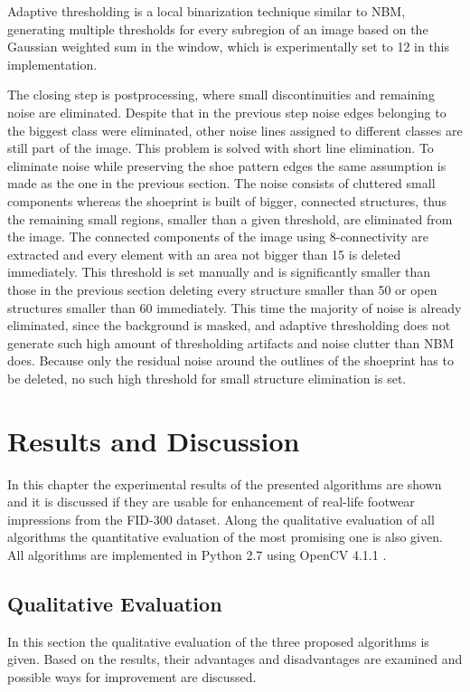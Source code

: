 \documentclass[draft,final]{vutinfth} %
\begin{document}
Adaptive thresholding is a local binarization technique similar to NBM, generating multiple thresholds for every subregion of an image based on the Gaussian weighted sum in the window, which is experimentally set to 12 in this implementation.
\par
The closing step is postprocessing, where small discontinuities and remaining noise are eliminated.
Despite that in the previous step noise edges belonging to the biggest class were eliminated, other noise lines assigned to different classes are still part of the image.
This problem is solved with short line elimination.
To eliminate noise while preserving the shoe pattern edges the same assumption is made as the one in the previous section.
The noise consists of cluttered small components whereas the shoeprint is built of bigger, connected structures, thus the remaining small regions, smaller than a given threshold, are eliminated from the image.
The connected components of the image using 8-connectivity are extracted and every element with an area not bigger than 15 is deleted immediately.
This threshold is set manually and is significantly smaller than those in the previous section deleting every structure smaller than 50 or open structures smaller than 60 immediately.
This time the majority of noise is already eliminated, since the background is masked, and adaptive thresholding does not generate such high amount of thresholding artifacts and noise clutter than NBM does.
Because only the residual noise around the outlines of the shoeprint has to be deleted, no such high threshold for small structure elimination is set.

\chapter{Results and Discussion}
\label{results}
\par
In this chapter the experimental results of the presented algorithms are shown and it is discussed if they are usable for enhancement of real-life footwear impressions from the FID-300 dataset.
Along the qualitative evaluation of all algorithms the quantitative evaluation of the most promising one is also given.
All algorithms are implemented in Python 2.7 \cite{van1995python} using OpenCV 4.1.1 \cite{opencv_library}.

\section{Qualitative Evaluation}
In this section the qualitative evaluation of the three proposed algorithms is given.
Based on the results, their advantages and disadvantages are examined and possible ways for improvement are discussed.  
\end{document}
